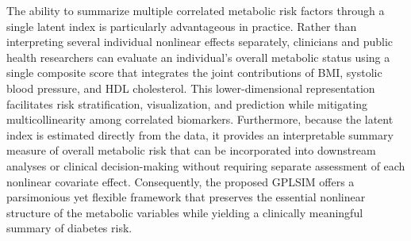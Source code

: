 The ability to summarize multiple correlated metabolic risk factors through a single latent index is particularly advantageous in practice. Rather than interpreting several individual nonlinear effects separately, clinicians and public health researchers can evaluate an individual's overall metabolic status using a single composite score that integrates the joint contributions of BMI, systolic blood pressure, and HDL cholesterol. This lower-dimensional representation facilitates risk stratification, visualization, and prediction while mitigating multicollinearity among correlated biomarkers. Furthermore, because the latent index is estimated directly from the data, it provides an interpretable summary measure of overall metabolic risk that can be incorporated into downstream analyses or clinical decision-making without requiring separate assessment of each nonlinear covariate effect. Consequently, the proposed GPLSIM offers a parsimonious yet flexible framework that preserves the essential nonlinear structure of the metabolic variables while yielding a clinically meaningful summary of diabetes risk.


